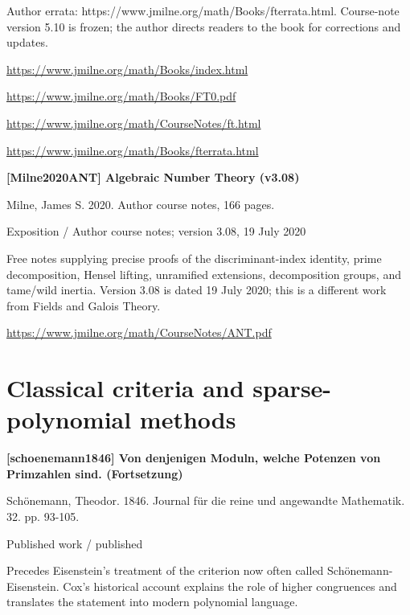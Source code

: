 \documentclass[11pt,a4paper,oneside,openany]{book}
\begin{document}
{\small Author errata: https://www.jmilne.org/math/Books/fterrata.html. Course-note version 5.10 is frozen; the author directs readers to the book for corrections and updates.}\par
{\footnotesize\url{https://www.jmilne.org/math/Books/index.html}}\par
{\footnotesize\url{https://www.jmilne.org/math/Books/FT0.pdf}}\par
{\footnotesize\url{https://www.jmilne.org/math/CourseNotes/ft.html}}\par
{\footnotesize\url{https://www.jmilne.org/math/Books/fterrata.html}}\par
\vspace{9pt}
\hypertarget{ref:Milne2020ANT}{}
{\sffamily\bfseries\color{atlasgreen}[Milne2020ANT] Algebraic Number Theory (v3.08)}\par
\color{black} Milne, James S. 2020. Author course notes, 166 pages.\par
{\small\sffamily\color{atlasgold}Exposition / Author course notes; version 3.08, 19 July 2020}\par
\color{black} Free notes supplying precise proofs of the discriminant-index identity, prime decomposition, Hensel lifting, unramified extensions, decomposition groups, and tame/wild inertia. Version 3.08 is dated 19 July 2020; this is a different work from Fields and Galois Theory.\par
{\footnotesize\url{https://www.jmilne.org/math/CourseNotes/ANT.pdf}}\par
\vspace{9pt}
\section{Classical criteria and sparse-polynomial methods}
\hypertarget{ref:schoenemann1846}{}
{\sffamily\bfseries\color{atlasgreen}[schoenemann1846] Von denjenigen Moduln, welche Potenzen von Primzahlen sind. (Fortsetzung)}\par
\color{black} Schönemann, Theodor. 1846. Journal für die reine und angewandte Mathematik. 32. pp. 93-105.\par
{\small\sffamily\color{atlasgold}Published work / published}\par
\color{black} Precedes Eisenstein's treatment of the criterion now often called Schönemann-Eisenstein. Cox's historical account explains the role of higher congruences and translates the statement into modern polynomial language.\par
\end{document}
